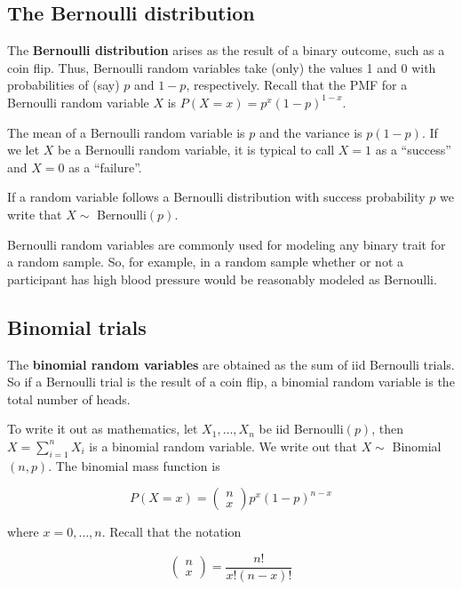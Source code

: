 \documentclass[]{article}
\begin{document}
\subsection{The Bernoulli
distribution}\label{the-bernoulli-distribution}

The \textbf{Bernoulli distribution} arises as the result of a binary
outcome, such as a coin flip. Thus, Bernoulli random variables take
(only) the values 1 and 0 with probabilities of (say) $p$ and $1-p$,
respectively. Recall that the PMF for a Bernoulli random variable $X$ is
$P(X = x) =  p^x (1 - p)^{1 - x}$.

The mean of a Bernoulli random variable is $p$ and the variance is
$p(1 - p)$. If we let $X$ be a Bernoulli random variable, it is typical
to call $X=1$ as a ``success'' and $X=0$ as a ``failure''.

If a random variable follows a Bernoulli distribution with success
probability $p$ we write that $X \sim$ Bernoulli$(p)$.

Bernoulli random variables are commonly used for modeling any binary
trait for a random sample. So, for example, in a random sample whether
or not a participant has high blood pressure would be reasonably modeled
as Bernoulli.

\subsection{Binomial trials}\label{binomial-trials}

The \textbf{binomial random variables} are obtained as the sum of iid
Bernoulli trials. So if a Bernoulli trial is the result of a coin flip,
a binomial random variable is the total number of heads.

To write it out as mathematics, let $X_1,\ldots,X_n$ be iid
Bernoulli$(p)$, then $X = \sum_{i=1}^n X_i$ is a binomial random
variable. We write out that $X \sim$ Binomial$(n,p)$. The binomial mass
function is

\[
P(X = x) =
\left(
\begin{array}{c}
  n \\ x
\end{array}
\right)
p^x(1 - p)^{n-x}
\]

where $x=0,\ldots,n$. Recall that the notation

\[
\left(
  \begin{array}{c} n \\ x \end{array}
\right) = \frac{n!}{x!(n-x)!}
\]
\end{document}
